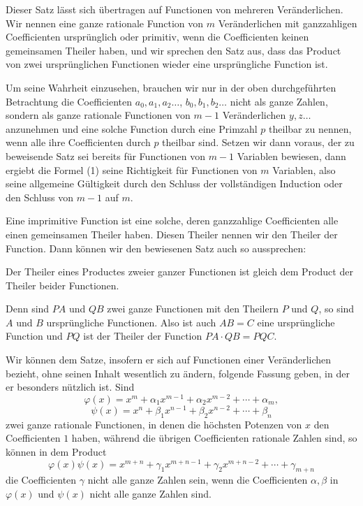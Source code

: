 \documentclass[11pt]{article}
\begin{document}
Dieser Satz lässt sich übertragen auf Functionen von mehreren Veränderlichen. Wir nennen eine ganze rationale Function von $m$ Veränderlichen mit ganzzahligen Coefficienten ursprünglich oder primitiv, wenn die Coefficienten keinen gemeinsamen Theiler haben, und wir sprechen den Satz aus, dass das Product von zwei ursprünglichen Functionen wieder eine ursprüngliche Function ist.

Um seine Wahrheit einzusehen, brauchen wir nur in der oben durchgeführten Betrachtung die Coefficienten $a_0,a_1,a_2\ldots$, $b_0,b_1,b_2\ldots$ nicht als ganze Zahlen, sondern als ganze rationale Functionen von $m-1$ Veränderlichen $y,z\ldots$ anzunehmen und eine solche Function durch eine Primzahl $p$ theilbar zu nennen, wenn alle ihre Coefficienten durch $p$ theilbar sind. Setzen wir dann voraus, der zu beweisende Satz sei bereits für Functionen von $m-1$ Variablen bewiesen, dann ergiebt die Formel (1) seine Richtigkeit für Functionen von $m$ Variablen, also seine allgemeine Gültigkeit durch den Schluss der vollständigen Induction oder den Schluss von $m-1$ auf $m$.

Eine imprimitive Function ist eine solche, deren ganzzahlige Coefficienten alle einen gemeinsamen Theiler haben. Diesen Theiler nennen wir den Theiler der Function. Dann können wir den bewiesenen Satz auch so aussprechen:

Der Theiler eines Productes zweier ganzer Functionen ist gleich dem Product der Theiler beider Functionen.

Denn sind $PA$ und $QB$ zwei ganze Functionen mit den Theilern $P$ und $Q$, so sind $A$ und $B$ ursprüngliche Functionen. Also ist auch $AB=C$ eine ursprüngliche Function und $PQ$ ist der Theiler der Function $PA\cdot QB=PQC$.

Wir können dem Satze, insofern er sich auf Functionen einer Veränderlichen bezieht, ohne seinen Inhalt wesentlich zu ändern, folgende Fassung geben, in der er besonders nützlich ist. Sind
\[
 \varphi(x)=x^m+\alpha_1x^{m-1}+\alpha_2x^{m-2}+\cdots+\alpha_m,
\]
\[
 \psi(x)=x^n+\beta_1x^{n-1}+\beta_2x^{n-2}+\cdots+\beta_n
\]
zwei ganze rationale Functionen, in denen die höchsten Potenzen von $x$ den Coefficienten $1$ haben, während die übrigen Coefficienten rationale Zahlen sind, so können in dem Product
\[
 \varphi(x)\psi(x)=x^{m+n}+\gamma_1x^{m+n-1}+\gamma_2x^{m+n-2}+\cdots+\gamma_{m+n}
\]
die Coefficienten $\gamma$ nicht alle ganze Zahlen sein, wenn die Coefficienten $\alpha,\beta$ in $\varphi(x)$ und $\psi(x)$ nicht alle ganze Zahlen sind.
\end{document}
